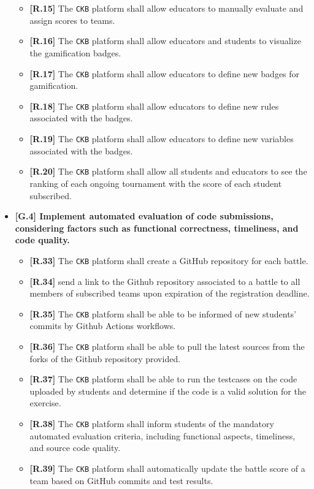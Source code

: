 \begin{itemize}
\begin{itemize}
            \item \textbf{[R.15]} The \verb|CKB| platform shall allow educators to manually evaluate and assign scores to teams. 
            \item \textbf{[R.16]} The \verb|CKB| platform shall allow educators and students to visualize the gamification badges.
            \item \textbf{[R.17]} The \verb|CKB| platform shall allow educators to define new badges for gamification.
            \item \textbf{[R.18]} The \verb|CKB| platform shall allow educators to define new rules associated with the badges.
            \item \textbf{[R.19]} The \verb|CKB| platform shall allow educators to define new variables associated with the badges.
            \item \textbf{[R.20]} The \verb|CKB| platform shall allow all students and educators to see the ranking of each ongoing tournament with the score of each student subscribed.
        \end{itemize}

        \item \textbf{{[G.4]} Implement automated evaluation of code submissions, considering factors such as functional correctness, timeliness, and code quality. }
        \begin{itemize}
            \item \textbf{[R.33]} The \verb|CKB| platform shall create a GitHub repository for each battle.
            \item \textbf{[R.34]} send a link to the Github repository associated to a battle to all members of subscribed teams upon expiration of the registration deadline.
            \item \textbf{[R.35]} The \verb|CKB| platform shall be able to be informed of new students' commits by Github Actions workflows. 
            \item \textbf{[R.36]} The \verb|CKB| platform shall be able to pull the latest sources from the forks of the Github repository provided.
            \item \textbf{[R.37]} The \verb|CKB| platform shall be able to run the testcases on the code uploaded by students and determine if the code is a valid solution for the exercise.
            \item \textbf{[R.38]} The \verb|CKB| platform shall inform students of the mandatory automated evaluation criteria, including functional aspects, timeliness, and source code quality.  
            \item \textbf{[R.39]} The \verb|CKB| platform shall automatically update the battle score of a team based on GitHub commits and test results.
        \end{itemize}


\end{itemize}
